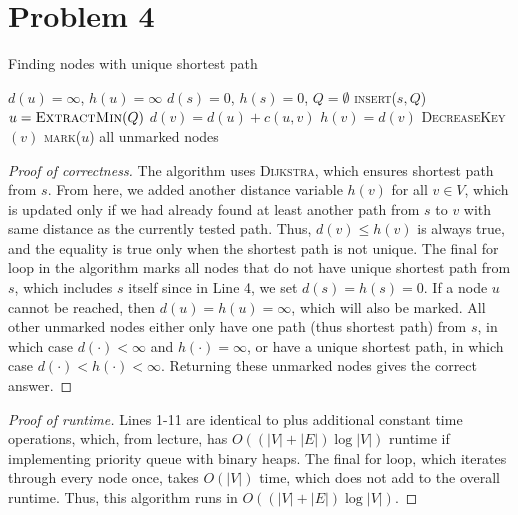 \documentclass{article}
\begin{document}
\pagebreak

\section*{Problem 4}
\begin{algorithm}
\caption{Finding nodes with unique shortest path}
\begin{algorithmic}[1]
	\State $d(u)=\infty$, $h(u)=\infty$
\EndFor
\State $d(s)=0$, $h(s)=0$, $Q=\emptyset$
\State \textsc{insert}($s,Q$)
	\State $u = \textsc{ExtractMin}(Q)$
		 $d(v)=d(u)+c(u,v)$
		 $h(v)=d(v)$
		\EndIf
		\State \textsc{DecreaseKey}$(v)$
	\EndFor
\EndWhile
{}
	 \textsc{mark}($u$)
	\EndIf
\EndFor
\State \Return all unmarked nodes
\EndFunction
\end{algorithmic}

\end{algorithm}

\begin{proof}[Proof of correctness]
The algorithm uses \textsc{Dijkstra}, which ensures shortest path from $s$. From here, we added another distance variable $h(v)$ for all $v\in V$, which is updated only if we had already found at least another path from $s$ to $v$ with same distance as the currently tested path. Thus, $d(v)\leq h(v)$ is always true, and the equality is true only when the shortest path is not unique. The final for loop in the algorithm marks all nodes that do not have unique shortest path from $s$, which includes $s$ itself since in Line 4, we set $d(s)=h(s)=0$. If a node $u$ cannot be reached, then $d(u)=h(u)=\infty$, which will also be marked. All other unmarked nodes either only have one path (thus shortest path) from $s$, in which case $d(\cdot)<\infty$ and $h(\cdot)=\infty$, or have a unique shortest path, in which case $d(\cdot)<h(\cdot)<\infty$. Returning these unmarked nodes gives the correct answer.
\end{proof}

\begin{proof}[Proof of runtime]
Lines 1-11 are identical to  plus additional constant time operations, which, from lecture, has $O( (|V|+|E|)\log |V|)$ runtime if implementing priority queue with binary heaps. The final for loop, which iterates through every node once, takes $O(|V|)$ time, which does not add to the overall runtime. Thus, this algorithm runs in $O( (|V|+|E|)\log |V|)$.
\end{proof}
\end{document}
